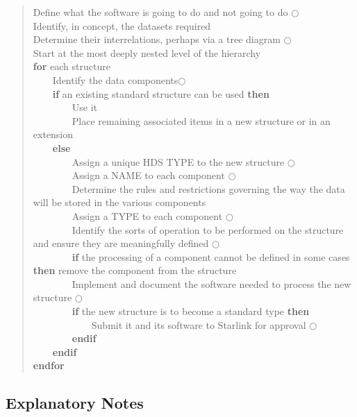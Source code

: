 \documentclass[twoside,11pt]{article}
\newcommand{\htmlref}[2]{#1}
\newcommand{\xlabel}[1]{}
\newcommand{\numcir}[1]{\mbox{\hspace{3ex}$\bigcirc$\hspace{-1.7ex}{\small #1}}}
\newcommand{\numcir}[1]{~~~~~~ \htmlref{{#1}}{se:expnote{#1}}}
\begin{document}
\begin{htmlonly}
\begin{quote}
Define what the software is going to do and not going to do \numcir{1} \\
Identify, in concept, the datasets required \\
Determine their interrelations, perhaps via a tree diagram \numcir{2}\\
Start at the most deeply nested level of the hierarchy\\
{\bf for} each structure \\
~~~~Identify the data components\numcir{3}\\
~~~~{\bf if} an existing standard structure can be used {\bf then} \\
~~~~~~~~Use it \\
~~~~~~~~Place remaining associated items in a new structure or in an extension \\
~~~~{\bf else} \\
~~~~~~~~Assign a unique HDS TYPE to the new structure \numcir{4}\\
~~~~~~~~Assign a NAME to each component \numcir{5}\\
~~~~~~~~Determine the rules and restrictions governing the way the data will be stored in the various components\\
~~~~~~~~Assign a TYPE to each component \numcir{6}\\
~~~~~~~~Identify the sorts of operation to be performed on the structure and ensure they are meaningfully defined \numcir{7}\\
~~~~~~~~{\bf if} the processing of a component cannot be defined in some cases {\bf then} remove the component from the structure\\
~~~~~~~~Implement and document the software needed to process the new structure \numcir{8}\\
~~~~~~~~{\bf if} the new structure is to become a standard type {\bf then} \\
~~~~~~~~~~~~Submit it and its software to Starlink for approval \numcir{9}\\
~~~~~~~~{\bf endif} \\
~~~~{\bf endif} \\
{\bf endfor} \\
\end{quote}
\end{htmlonly}


\xlabel{se_newexn}\subsection{Explanatory Notes\label{se:newexn}}
\end{document}
